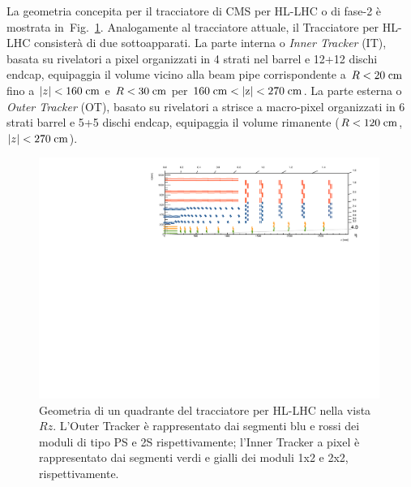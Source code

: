 La geometria concepita per il tracciatore di CMS per HL-LHC o di fase-2 \`e mostrata in~Fig.~\ref{fig:TkLayoutPhaseII}. Analogamente al tracciatore attuale, il Tracciatore per HL-LHC consister\`a di due sottoapparati. La parte interna o {\em Inner Tracker} (IT), basata su rivelatori a pixel organizzati in 4 strati nel barrel e 12+12 dischi endcap, equipaggia il volume vicino alla beam pipe corrispondente a $R<20\rm \; cm$ fino a $|z|<160\rm \; cm$ e $R<30\rm \; cm$ per $160\cm<|z|<270\cm$. La parte esterna o {\em Outer Tracker} (OT), basato su rivelatori a strisce a macro-pixel organizzati in 6 strati barrel e 5+5 dischi endcap, equipaggia il volume rimanente ($R<120\rm \; cm$, $|z|<270\rm \; cm$).
\begin{figure}
\centering
\includegraphics[width=0.99\textwidth]{Immagini/fullLayout000.pdf}
\caption{Geometria di un quadrante del tracciatore per HL-LHC nella vista $Rz$. L'Outer Tracker \`e rappresentato dai segmenti blu e rossi dei moduli di tipo PS e 2S rispettivamente; l'Inner Tracker a pixel \`e rappresentato dai segmenti verdi e gialli dei moduli 1x2 e 2x2, rispettivamente.}
\label{fig:TkLayoutPhaseII}
\end{figure}

